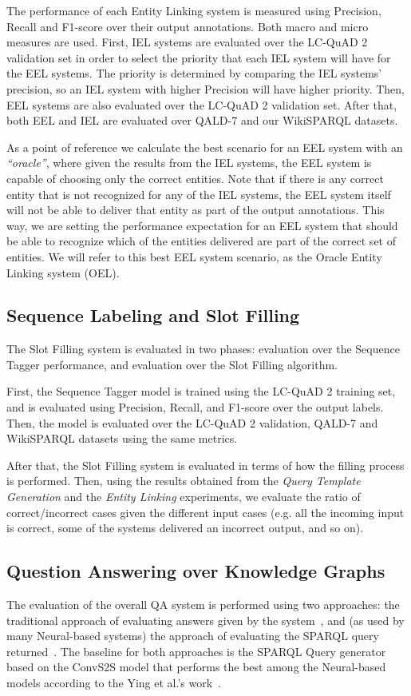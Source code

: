 The performance of each Entity Linking system is measured using Precision, Recall and F1-score 
over their output annotations. Both macro and micro measures are used. First, IEL systems are 
evaluated over the LC-QuAD 2 validation set in order to select the priority that each IEL system 
will have for the EEL systems. The priority is determined by comparing the IEL systems’ precision, 
so an IEL system with higher Precision will have higher priority. Then, EEL systems are also 
evaluated over the LC-QuAD 2 validation set. After that, both EEL and IEL are evaluated over 
QALD-7 and our WikiSPARQL datasets.

As a point of reference we calculate the best scenario for an EEL system with an \textit{“oracle”}, 
where given the results from the IEL systems, the EEL system is capable of choosing only the 
correct entities. Note that if there is any correct entity that is not recognized for any of the 
IEL systems, the EEL system itself will not be able to deliver that entity as part of the output 
annotations. This way, we are setting the performance expectation for an EEL system that should 
be able to recognize which of the entities delivered are part of the correct set of entities. We 
will refer to this best EEL system scenario, as the Oracle Entity Linking system (OEL).


\subsection{Sequence Labeling and Slot Filling}
\label{cap4:experimentalDesign/seqLabAndSlotFilling}
The Slot Filling system is evaluated in two phases: evaluation over the Sequence Tagger 
performance, and evaluation over the Slot Filling algorithm. 

First, the Sequence Tagger model is trained using the LC-QuAD 2 training set, and is evaluated 
using Precision, Recall, and F1-score over the output labels. Then, the model is evaluated over 
the LC-QuAD 2 validation, QALD-7 and WikiSPARQL datasets using the same metrics.

After that, the Slot Filling system is evaluated in terms of how the filling process is performed. 
Then, using the results obtained from the \textit{Query Template Generation} and the 
\textit{Entity Linking} experiments, we evaluate the ratio of correct/incorrect cases given the 
different input cases (e.g. all the incoming input is correct, some of the systems delivered an 
incorrect output, and so on).

\subsection{Question Answering over Knowledge Graphs}
\label{cap4:experimentalDesign/QAKG}
The evaluation of the overall QA system is performed using two approaches: the traditional 
approach of evaluating answers given by the system~\cite{qa:qald-Lopezetal2013}, and (as used by 
many Neural-based systems) the approach of evaluating the SPARQL query 
returned~\cite{nmt:nl-to-sparql-Yin19}. The baseline for both approaches is the SPARQL Query 
generator based on the ConvS2S model that performs the best among the Neural-based models 
according to the Ying et al.’s work~\cite{nmt:nl-to-sparql-Yin19}.

